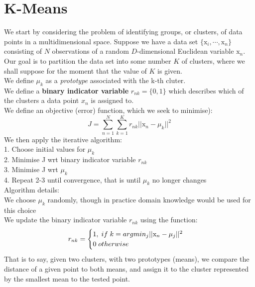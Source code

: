 \documentclass{article}
\begin{document}
\section{K-Means}
We start by considering the problem of identifying groups, or clusters, of data points in a multidimensional space. Suppose we have a data set $\{\mathrm{x}_i,\cdots,\mathrm{x}_n\}$ consisting
of $N$ observations of a random $D$-dimensional Euclidean variable $\mathrm{x}_n$. Our goal is to partition the data set into some number $K$ of clusters, where we shall suppose for the moment that the value of $K$ is given. \\ 
We define $\mu_k$ as a \textit{prototype} associated with the k-th cluter. \\
We define a \textbf{binary indicator variable} $r_{nk}=\{0,1\}$ which describes which of the clusters a data point $x_n$ is assigned to. \\
We define an objective (error) function, which we seek to minimise):
\begin{equation}
    J = \sum_{n=1}^N \sum_{k=1}^K r_{nk} ||\mathrm{x}_n-\mu_k||^2 \label{objective-function}
\end{equation}
We then apply the iterative algorithm: \\
1. Choose initial values for $\mu_k$ \\
2. Minimise J wrt binary indicator variable $r_{nk}$ \\
3. Minimise J wrt $\mu_k$ \\
4. Repeat 2-3 until convergence, that is until $\mu_k$ no longer changes \\
Algorithm details: \\
We choose $\mu_k$ randomly, though in practice domain knowledge would be used for this choice \\
We update the binary indicator variable $r_{nk}$ using the function: \\
$$
r_{nk} = \begin{cases}
               1,\hspace{1mm} if \hspace{1mm} k = argmin_j||\mathrm{x}_n-\mu_j||^2 \\
               0\hspace{1mm}otherwise
            \end{cases}
$$
That is to say, given two clusters, with two prototypes (means), we compare the distance of a given point to both means, and assign it to the cluster represented by the smallest mean to the tested point. \\
\end{document}
